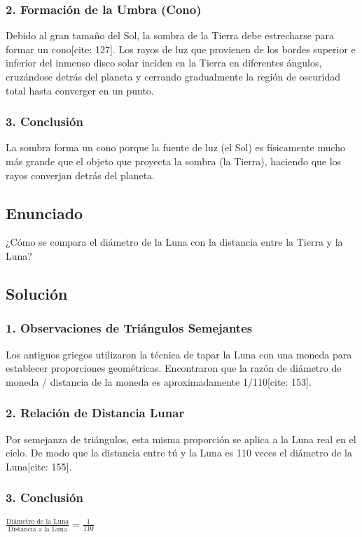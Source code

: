 \documentclass[12pt, a4paper]{article}
\begin{document}
\subsubsection*{2. Formación de la Umbra (Cono)}
Debido al gran tamaño del Sol, la sombra de la Tierra debe estrecharse para formar un cono[cite: 127]. Los rayos de luz que provienen de los bordes superior e inferior del inmenso disco solar inciden en la Tierra en diferentes ángulos, cruzándose detrás del planeta y cerrando gradualmente la región de oscuridad total hasta converger en un punto.

\subsubsection*{3. Conclusión}
La sombra forma un cono porque la fuente de luz (el Sol) es físicamente mucho más grande que el objeto que proyecta la sombra (la Tierra), haciendo que los rayos converjan detrás del planeta.

\newpage

\subsection*{Enunciado}
¿Cómo se compara el diámetro de la Luna con la distancia entre la Tierra y la Luna?

\subsection*{Solución}

\subsubsection*{1. Observaciones de Triángulos Semejantes}
Los antiguos griegos utilizaron la técnica de tapar la Luna con una moneda para establecer proporciones geométricas. Encontraron que la razón de diámetro de moneda / distancia de la moneda es aproximadamente 1/110[cite: 153].

\subsubsection*{2. Relación de Distancia Lunar}
Por semejanza de triángulos, esta misma proporción se aplica a la Luna real en el cielo. De modo que la distancia entre tú y la Luna es 110 veces el diámetro de la Luna[cite: 155].

\subsubsection*{3. Conclusión}
$\frac{\text{Diámetro de la Luna}}{\text{Distancia a la Luna}} = \frac{1}{110}$
\end{document}
